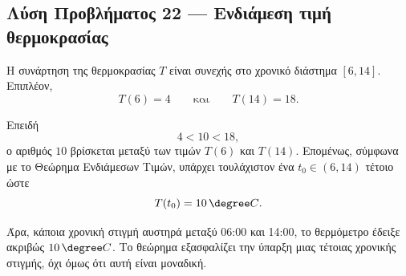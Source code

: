 \subsection*{Λύση Προβλήματος 22 --- Ενδιάμεση τιμή θερμοκρασίας}

Η συνάρτηση της θερμοκρασίας $T$ είναι συνεχής στο χρονικό διάστημα
$[6,14]$. Επιπλέον,
\[
  T(6)=4
  \qquad\text{και}\qquad
  T(14)=18.
\]

Επειδή
\[
  4<10<18,
\]
ο αριθμός $10$ βρίσκεται μεταξύ των τιμών $T(6)$ και $T(14)$.
Επομένως, σύμφωνα με το Θεώρημα Ενδιάμεσων Τιμών, υπάρχει τουλάχιστον
ένα $t_0\in(6,14)$ τέτοιο ώστε
\[
  {T(t_0)=10\,{}\degree C}.
\]

Άρα, κάποια χρονική στιγμή αυστηρά μεταξύ 06:00 και 14:00, το θερμόμετρο
έδειξε ακριβώς $10\,{}\degree C$. Το θεώρημα εξασφαλίζει την ύπαρξη μιας
τέτοιας χρονικής στιγμής, όχι όμως ότι αυτή είναι μοναδική.

